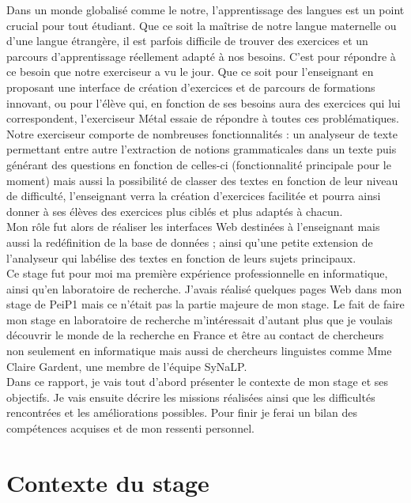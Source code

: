 \documentclass[12pt]{article}
\begin{document}
Dans un monde globalisé comme le notre, l’apprentissage des langues est un point crucial pour tout étudiant. Que ce soit la maîtrise de notre langue maternelle ou d’une langue étrangère, il est parfois difficile de trouver des exercices et un parcours d’apprentissage réellement adapté à nos besoins. C’est pour répondre à ce besoin que notre exerciseur a vu le jour. Que ce soit pour l’enseignant en proposant une interface de création d’exercices et de parcours de formations innovant, ou pour l’élève qui, en fonction de ses besoins aura des exercices qui lui correspondent, l’exerciseur Métal essaie de répondre à toutes ces problématiques.  \\
Notre exerciseur comporte de nombreuses fonctionnalités : un analyseur de texte permettant entre autre l'extraction de notions grammaticales dans un texte puis générant des questions en fonction de celles-ci (fonctionnalité principale pour le moment) mais aussi la possibilité de classer des textes en fonction de leur niveau de difficulté, l'enseignant verra la création d'exercices facilitée et pourra ainsi donner à ses élèves des exercices plus ciblés et plus adaptés à chacun. \\
Mon rôle fut alors de réaliser les interfaces Web destinées à l'enseignant mais aussi la redéfinition de la base de données ; ainsi qu'une petite extension de l'analyseur qui labélise des textes en fonction de leurs sujets principaux. \\
Ce stage fut pour moi ma première expérience professionnelle en informatique, ainsi qu’en laboratoire de recherche. J’avais réalisé quelques pages Web dans mon stage de PeiP1 mais ce n’était pas la partie majeure de mon stage. Le fait de faire mon stage en laboratoire de recherche m'intéressait d’autant plus que je voulais découvrir le monde de la recherche en France et être au contact de chercheurs non seulement en informatique mais aussi de chercheurs linguistes comme Mme Claire Gardent, une membre de l’équipe SyNaLP. \\
Dans ce rapport, je vais tout d’abord présenter le contexte de mon stage et ses objectifs. Je vais ensuite décrire les missions réalisées ainsi que les difficultés rencontrées et les améliorations possibles. Pour finir je ferai un bilan des compétences acquises et de mon ressenti personnel. 

\newpage 

\section{Contexte du stage}
\end{document}
